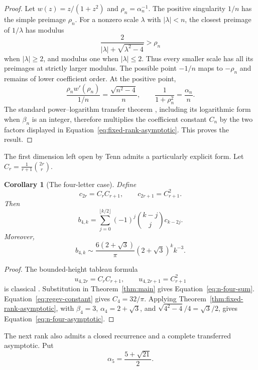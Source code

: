 \documentclass[11pt]{article}
\newtheorem{corollary}[theorem]{Corollary}
\theoremstyle{definition}
\begin{document}
\begin{proof}
Let $w(z)=z/(1+z^2)$ and $\rho_n=\alpha_n^{-1}$.  The positive singularity
$1/n$ has the simple preimage $\rho_n$.  For a nonzero scale $\lambda$ with
$|\lambda|<n$, the closest preimage of $1/\lambda$ has modulus
\[
 \frac{2}{|\lambda|+\sqrt{\lambda^2-4}}>\rho_n
\]
when $|\lambda|\ge2$, and modulus one when $|\lambda|\le2$.  Thus every
smaller scale has all its preimages at strictly larger modulus.  The possible
point $-1/n$ maps to $-\rho_n$ and remains of lower coefficient order.  At
the positive point,
\[
 \frac{\rho_n w'(\rho_n)}{1/n}=\frac{\sqrt{n^2-4}}n,
 \qquad
 \frac1{1+\rho_n^2}=\frac{\alpha_n}{n}.
\]
The standard power--logarithm transfer theorem
\cite[Chapter~VI]{FlajoletSedgewick2009}, including its logarithmic form when
$\beta_n$ is an integer, therefore multiplies the coefficient constant $C_n$
by the two factors displayed in
Equation~\eqref{eq:fixed-rank-asymptotic}.  This proves the result.
\end{proof}

The first dimension left open by Tenn admits a particularly explicit form.
Let $C_r=\frac1{r+1}\binom{2r}{r}$.

\begin{corollary}[The four-letter case]\label{cor:n-four}
Define
\[
 c_{2r}=C_rC_{r+1},\qquad c_{2r+1}=C_{r+1}^2.
\]
Then
\begin{equation}\label{eq:n-four-sum}
 b_{4,k}=\sum_{j=0}^{\lfloor k/2\rfloor}
 (-1)^j\binom{k-j}{j}c_{k-2j}.
\end{equation}
Moreover,
\begin{equation}\label{eq:n-four-asymptotic}
 b_{4,k}\sim
 \frac{6(2+\sqrt3)}{\pi}
 (2+\sqrt3)^k k^{-3}.
\end{equation}
\end{corollary}

\begin{proof}
The bounded-height tableau formula
\[
 u_{4,2r}=C_rC_{r+1},\qquad u_{4,2r+1}=C_{r+1}^2
\]
is classical \cite{GouyouBeauchamps1989}.  Substitution in
Theorem~\ref{thm:main} gives Equation~\eqref{eq:n-four-sum}.
Equation~\eqref{eq:regev-constant} gives $C_4=32/\pi$.  Applying
Theorem~\ref{thm:fixed-rank-asymptotic}, with
$\beta_4=3$, $\alpha_4=2+\sqrt3$, and
$\sqrt{4^2-4}/4=\sqrt3/2$, gives
Equation~\eqref{eq:n-four-asymptotic}.
\end{proof}

The next rank also admits a closed recurrence and a complete transferred
asymptotic.  Put
\[
 \alpha_5=\frac{5+\sqrt{21}}2.
\]
\end{document}
